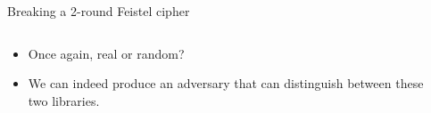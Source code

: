 \documentclass[aspectratio=169, lualatex, handout]{beamer}
\begin{document}
\begin{frame}{Breaking a 2-round Feistel cipher}
	\begin{columns}[c]
		\begin{column}{0.4\textwidth}
			\begin{itemize}[<+->]
				\item Once again, real or random?
				\item We can indeed produce an adversary \prog{} that can distinguish between these two libraries.
			\end{itemize}
		\end{column}
		\begin{column}{0.6\textwidth}
			\begin{center}
			\end{center}
		\end{column}
	\end{columns}
\end{frame}
\end{document}
